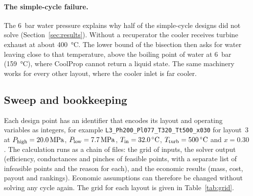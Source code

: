 \paragraph{The simple-cycle failure.} The \SI{6}{bar} water pressure explains why half of the simple-cycle designs did not solve (Section~\ref{sec:results}). Without a recuperator the cooler receives turbine exhaust at about \SI{400}{\celsius}. The lower bound of the bisection then asks for water leaving close to that temperature, above the boiling point of water at \SI{6}{bar} (\SI{159}{\celsius}), where CoolProp cannot return a liquid state. The same machinery works for every other layout, where the cooler inlet is far cooler.


\subsection{Sweep and bookkeeping}
Each design point has an identifier that encodes its layout and operating variables as integers, for example \texttt{L3\_Ph200\_Pl077\_T320\_Tt500\_x030} for layout~3 at $P_\mathrm{high} = \SI{20.0}{MPa}$, $P_\mathrm{low} = \SI{7.7}{MPa}$, $T_\mathrm{in} = \SI{32.0}{\celsius}$, $T_\mathrm{turb} = \SI{500}{\celsius}$ and $x = 0.30$. The calculation runs as a chain of files: the grid of inputs, the solver output (efficiency, conductances and pinches of feasible points, with a separate list of infeasible points and the reason for each), and the economic results (mass, cost, payout and rankings). Economic assumptions can therefore be changed without solving any cycle again. The grid for each layout is given in Table~\ref{tab:grid}.

